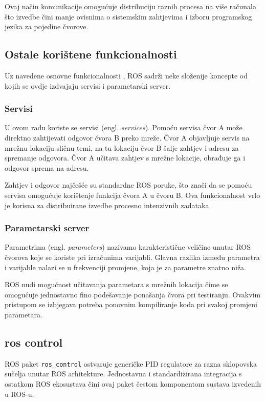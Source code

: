 \documentclass[times, utf8, diplomski, numeric]{fer}
\begin{document}
Ovaj način komunikacije omogućuje distribuciju raznih procesa na više računala što izvedbe čini manje ovisnima o sistemskim zahtjevima i izboru programskog jezika za pojedine čvorove. 

\subsection{Ostale korištene funkcionalnosti}
Uz navedene osnovne funkcionalnosti , ROS sadrži neke složenije koncepte od kojih se ovdje izdvajaju servisi i parametarski server. 

\subsubsection{Servisi}
U ovom radu koriste se servisi (engl. \textit{services}). 
Pomoću servisa čvor A može direktno zahtijevati odgovor čvora B preko mreže. 
Čvor A objavljuje servis na mrežnu lokaciju sličnu temi, na tu lokaciju čvor B šalje zahtjev i adresu za spremanje odgovora. 
Čvor A učitava zahtjev s mrežne lokacije, obrađuje ga i odgovor sprema na adresu.

Zahtjev i odgovor najčešće su standardne ROS poruke, što znači da se pomoću servisa omogućuje korištenje funkcija čvora A u čvoru B. 
Ova funkcionalnost vrlo je korisna za distribuirane izvedbe procesno intenzivnih zadataka. 

\subsubsection{Parametarski server}
Parametrima (engl. \textit{parameters}) nazivamo karakteristične veličine unutar ROS čvorova koje se koriste pri izračunima varijabli. 
Glavna razlika između parametra i varijable nalazi se u frekvenciji promjene, koja je za parametre znatno niža. 

ROS nudi mogućnost učitavanja parametara s mrežnih lokacija čime se omogućuje jednostavno fino podešavanje ponašanja čvora pri testiranju.
Ovakvim pristupom se izbjegava potreba ponovnim kompiliranje koda pri svakoj promjeni parametara.

\subsection{ros control}
ROS paket \texttt{ros\_control} ostvaruje generičke PID regulatore za razna sklopovska sučelja unutar ROS arhitekture.
Jednostavna i standardizirana integracija s ostatkom ROS ekosustava čini ovaj paket čestom komponentom sustava izvedenih u ROS-u.
\end{document}
